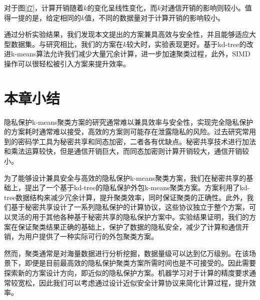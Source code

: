 对于图\ref{f7}，计算开销随着$ k $的变化呈线性变化，而$ k $对通信开销的影响则较小。值得一提的是，给定相同的$ k $值，不同的数据量对于计算开销的影响较小。

通过分析实验结果，我们发现本文提出的方案兼具高效与安全性，并且能够适应大型数据集。与研究\cite{wu2020secure}\cite{rong2017privacy}相比，我们的方案在$ k $较大时，实验表现更好。基于kd-tree的改进k-means算法允许我们减少大量冗余计算，进一步加速聚类过程，此外，SIMD操作可以很轻松被引入方案来提升效率。
\section{本章小结}
\label{s3-xiaojie}
隐私保护k-means聚类方案的研究通常难以兼具效率与安全性，实现完全隐私保护的方案耗时通常难以接受\cite{jaschke2019unsupervised}，高效的方案则可能存在泄露隐私的风险\cite{wu2020secure}。过去研究常用到的密码学工具为秘密共享\cite{mohassel2019practical}和同态加密\cite{jaschke2019unsupervised}\cite{wu2020secure}，二者各有优缺点。秘密共享技术进行加法和乘法运算较快，但是通信开销巨大，而同态加密则计算开销较大，通信开销较小。

为了能够设计兼具安全与高效的隐私保护k-means聚类方案，我们在秘密共享的基础上，提出了一个基于kd-tree的隐私保护外包k-means聚类方案。方案利用了kd-tree数据结构来减少冗余计算，提升聚类效率，同时保证聚类的正确性。此外，我们基于秘密共享设计了一系列隐私保护的计算协议，这些协议独立于整个方案，可以灵活的用于其他各种基于秘密共享的隐私保护方案中。实验结果证明，我们的方案在保证聚类结果正确的基础上，保护了数据的隐私安全，减少了计算和通信开销，为用户提供了一种实际可行的外包聚类方案。

然而，聚类通常是对海量数据进行分析挖掘，数据量级可以达到亿万级别。在该场景下，即便是目前最高效的隐私保护聚类方案所需时间也是不可接受的。因此需要探索新的方案设计方向，即近似的隐私保护方案。机器学习对于计算的精度要求通常较宽松，因此我们可以考虑通过设计近似安全计算协议来简化计算过程，提升效率。